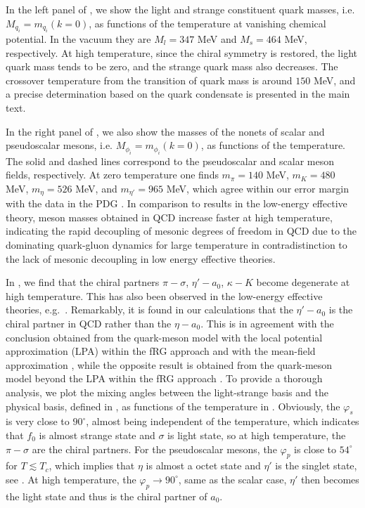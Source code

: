 \documentclass[reprint,twocolumn,superscriptaddress,preprintnumbers,amsmath,amssymb,aps,prd,floatfix]{revtex4-2}
\begin{document}
In the left panel of , we show the light and strange constituent quark masses, i.e. $M_{q_i}=m_{q_i}(k=0)$, as functions of the temperature at vanishing chemical potential. In the vacuum they are $M_{l}=347$ MeV and $M_{s}=464$ MeV, respectively. At high temperature, since the chiral symmetry is restored, the light quark mass tends to be zero, and the strange quark mass also decreases. The crossover temperature from the transition of quark mass is around $150$ MeV, and a precise determination based on the quark condensate is presented in the main text.

In the right panel of , we also show the masses of the nonets of scalar and pseudoscalar mesons, i.e. $M_{\phi_i}=m_{\phi_i}(k=0)$, as functions of the temperature. The solid and dashed lines correspond to the pseudoscalar and scalar meson fields, respectively. At zero temperature one finds $m_{\pi}=140$ MeV, $m_{K}=480$ MeV, $m_{\eta}=526$ MeV, and $m_{\eta'}=965$ MeV, which agree within our error margin with the data in the PDG \cite{Zyla:2020zbs}. 
In comparison to results in the low-energy effective theory, meson masses obtained in QCD increase faster at high temperature, indicating the rapid decoupling of mesonic degrees of freedom in QCD due to the dominating quark-gluon dynamics for large temperature in contradistinction to the lack of mesonic decoupling in low energy effective theories. 

In , we find that the chiral partners $\pi-\sigma$, $\eta' - a_0$, $\kappa-K$ become degenerate at high temperature. This has also been observed in the low-energy effective theories, e.g.~\cite{Schaefer:2008hk, Tiwari:2013pg, Mitter:2013fxa, Rennecke:2016tkm, Wen:2018nkn, Rai:2018ufz}. Remarkably, it is found in our calculations that the $\eta' - a_0$ is the chiral partner in QCD rather than the $\eta - a_0$. This is in agreement with the conclusion obtained from the quark-meson model with the local potential approximation (LPA) within the fRG approach \cite{Mitter:2013fxa, Rennecke:2016tkm, Wen:2018nkn} and with the mean-field approximation \cite{Schaefer:2008hk, Tiwari:2013pg, Rai:2018ufz}, while the opposite result is obtained from the quark-meson model beyond the LPA within the fRG approach \cite{Rennecke:2016tkm}. To provide a thorough analysis, we plot the mixing angles between the light-strange basis and the physical basis, defined in , as functions of the temperature in . Obviously, the $\varphi_s$ is very close to $90^\circ$, almost being independent of the temperature, which indicates that $f_0$ is almost strange state and $\sigma$ is light state, so at high temperature, the $\pi-\sigma$ are the chiral partners. For the pseudoscalar mesons, the $\varphi_p$ is close to $54^\circ$ for $T\lesssim T_c$, which implies that $\eta$ is almost a octet state and $\eta'$ is the singlet state, see \cite{Rennecke:2016tkm}. At high temperature, the $\varphi_p\rightarrow 90^\circ$, same as the scalar case, $\eta'$ then becomes the light state and thus is the chiral partner of $a_0$.
\end{document}
